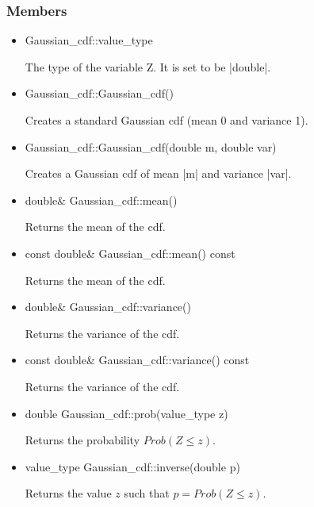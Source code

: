 \documentclass[12pt,twoside]{report}
\begin{document}
\htmlrule[CLEAR=all]  \subsubsection*{Members}
\begin{itemize}
\item 
\begin{code}
Gaussian_cdf::value_type
\end{code}

The type of the variable Z. It is set to be |double|.

\item 
\begin{code}
Gaussian_cdf::Gaussian_cdf()
\end{code}

Creates a standard Gaussian cdf (mean 0 and variance 1). 

\item 
\begin{code}
Gaussian_cdf::Gaussian_cdf(double m, double var)
\end{code}

Creates a Gaussian cdf of mean |m| and variance |var|. 

\item 
\begin{code}
double& Gaussian_cdf::mean()
\end{code}

Returns the mean of the cdf.

\item 
\begin{code}
const double& Gaussian_cdf::mean() const
\end{code}

Returns the mean of the cdf.

\item 
\begin{code}
double& Gaussian_cdf::variance()
\end{code}

Returns the variance of the cdf.

\item 
\begin{code}
const double& Gaussian_cdf::variance() const
\end{code}

Returns the variance of the cdf.

\item 
\begin{code}
double Gaussian_cdf::prob(value_type z)
\end{code}

Returns the probability $Prob(Z \le z)$.

\item 
\begin{code}
value_type Gaussian_cdf::inverse(double p)
\end{code}

Returns the value $z$ such that $p=Prob(Z \le z)$.

\end{itemize}
\end{document}
